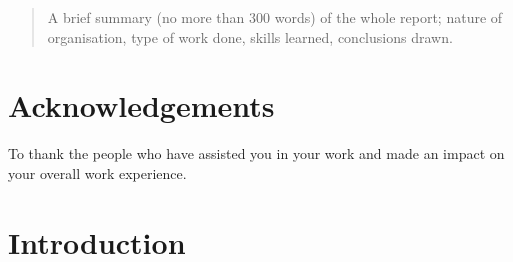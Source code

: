 \documentclass[pdftex, 12pt, a4paper, twoside]{article} %
\let\oldsection\section
\def\section{\clearpage\oldsection}
\begin{document}


\thispagestyle{plain} %

\setcounter{page}{2}


\renewcommand{\abstractname}{Summary}
\begin{abstract}


A brief summary (no more than 300 words) of the whole report; nature of organisation, type of work done, skills learned, conclusions drawn.

\lipsum[1-2]

\end{abstract}

\section*{Acknowledgements}


To thank the people who have assisted you in your work and made an impact on your overall work experience.

\lipsum[1-2]


\renewcommand{\contentsname}{Table of Contents}
\tableofcontents
{}
\listoffigures
{}
\listoftables
{}
\clearpage

\setcounter{page}{1}

\section{Introduction}
\label{sec:introduction}
\end{document}
